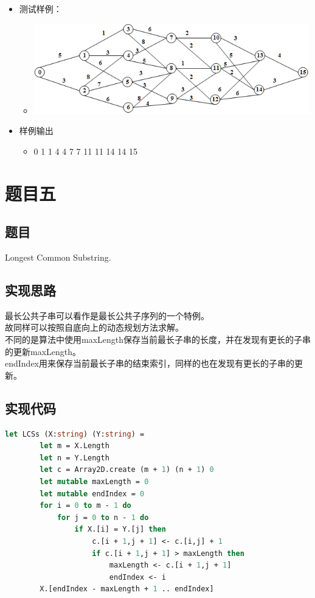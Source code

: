 \documentclass[a4paper]{article}
\begin{document}
\begin{itemize}
\item
    测试样例：
    \begin{itemize}
    \item
        \includegraphics[width=12cm]{2-4.png}
    \end{itemize}
\item
    样例输出
    \begin{itemize}
    \item
        0 1 1 4 4 7 7 11 11 14 14 15
    \end{itemize}
\end{itemize}

\section{题目五}

\subsection{题目}
 Longest Common Substring. 

\subsection{实现思路}
最长公共子串可以看作是最长公共子序列的一个特例。\\
故同样可以按照自底向上的动态规划方法求解。\\
不同的是算法中使用maxLength保存当前最长子串的长度，并在发现有更长的子串的更新maxLength。\\
endIndex用来保存当前最长子串的结束索引，同样的也在发现有更长的子串的更新。

\subsection{实现代码}
\begin{lstlisting}[language=ML]
    let LCSs (X:string) (Y:string) = 
        let m = X.Length
        let n = Y.Length
        let c = Array2D.create (m + 1) (n + 1) 0
        let mutable maxLength = 0
        let mutable endIndex = 0
        for i = 0 to m - 1 do
            for j = 0 to n - 1 do
                if X.[i] = Y.[j] then 
                    c.[i + 1,j + 1] <- c.[i,j] + 1
                    if c.[i + 1,j + 1] > maxLength then
                        maxLength <- c.[i + 1,j + 1]
                        endIndex <- i
        X.[endIndex - maxLength + 1 .. endIndex]
\end{lstlisting}
\end{document}
